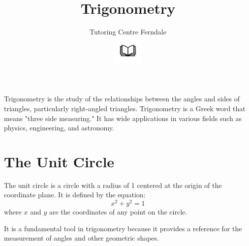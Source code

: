 \documentclass[12pt]{article}
\title{\textbf{Trigonometry}}
\author{Tutoring Centre Ferndale\\\includegraphics[width=4em]{ApS_logo.png}}
\date{}
\begin{document}
\maketitle

Trigonometry is the study of the relationships between the angles and sides of triangles, particularly right-angled triangles. Trigonometry is a Greek word that means "three side measuring." It has wide applications in various fields such as physics, engineering, and astronomy.

\section*{The Unit Circle}
The unit circle is a circle with a radius of 1 centered at the origin of the coordinate plane. It is defined by the equation:
$$x^2 + y^2 = 1$$
where \(x\) and \(y\) are the coordinates of any point on the circle.

\begin{center}
\end{center}

It is a fundamental tool in trigonometry because it provides a reference for the measurement of angles and other geometric shapes.\\
\end{document}
